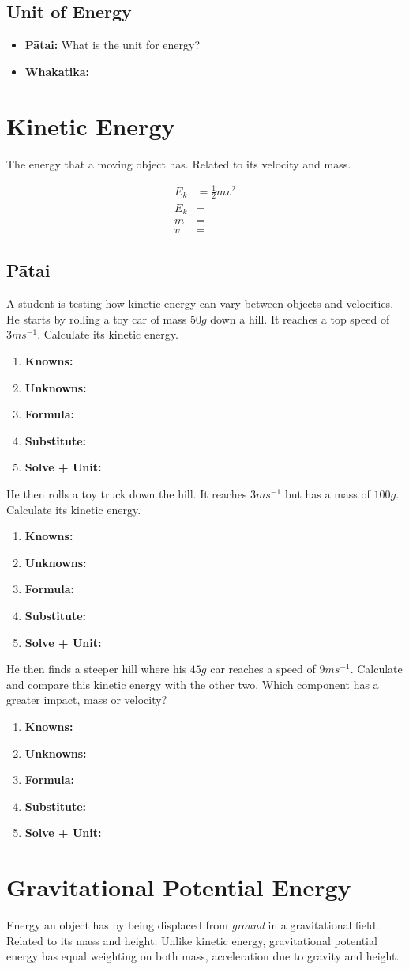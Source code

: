 \documentclass{report}
\newcommand\kufss{
	\begin{enumerate}[itemsep=15pt,label=,leftmargin=0.5cm]
		\item \textbf{Knowns:}
		\item \textbf{Unknowns:}
		\item \textbf{Formula:}
		\item \textbf{Substitute:}
		\item \textbf{Solve + Unit:}
	\end{enumerate}
}
\begin{document}
\subsection{Unit of Energy}

\begin{itemize}
	\item \textbf{Pātai:} What is the unit for energy?
	\item \textbf{Whakatika:}
\end{itemize}

\section{Kinetic Energy}

The energy that a moving object has. Related to its velocity and mass.

\begin{align*}
    E_{k} &= \frac{1}{2}mv^{2} \\
    E_{k} &= \\
    m &= \\
    v &=
\end{align*}

\subsection{Pātai}
A student is testing how kinetic energy can vary between objects and velocities. He starts by rolling a toy car of mass $50g$ down a hill. It reaches a top speed of $3ms^{-1}$. Calculate its kinetic energy.
\kufss

He then rolls a toy truck down the hill. It reaches $3ms^{-1}$ but has a mass of $100g$. Calculate its kinetic energy.
\kufss

He then finds a steeper hill where his $45g$ car reaches a speed of $9ms^{-1}$. Calculate and compare this kinetic energy with the other two. Which component has a greater impact, mass or velocity?
\kufss
\vspace{3cm}

\section{Gravitational Potential Energy}
Energy an object has by being displaced from \textit{ground} in a gravitational field. Related to its mass and height. Unlike kinetic energy, gravitational potential energy has equal weighting on both mass, acceleration due to gravity and height.
\end{document}
